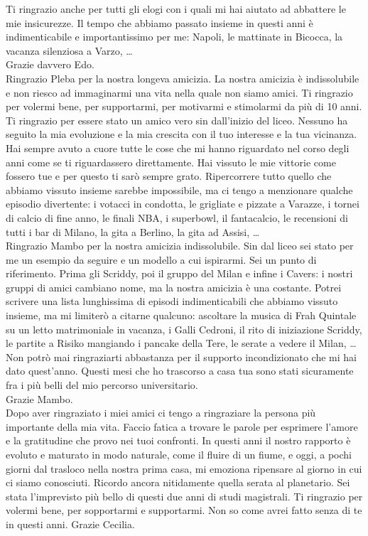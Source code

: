 Ti ringrazio anche per tutti gli elogi con i quali mi hai aiutato ad abbattere le mie insicurezze.
Il tempo che abbiamo passato insieme in questi anni è indimenticabile e importantissimo per me: Napoli, le 
mattinate in Bicocca, la vacanza silenziosa a Varzo, …\\
Grazie davvero Edo.\\
Ringrazio Pleba per la nostra longeva amicizia. La nostra amicizia è indissolubile e non riesco ad immaginarmi 
una vita nella quale non siamo amici. Ti ringrazio per volermi bene, per supportarmi, per motivarmi e stimolarmi 
da più di 10 anni. Ti ringrazio per essere stato un amico vero sin dall’inizio del liceo. Nessuno ha seguito la 
mia evoluzione e la mia crescita con il tuo interesse e la tua vicinanza. Hai sempre avuto a cuore tutte le cose 
che mi hanno riguardato nel corso degli anni come se ti riguardassero direttamente.
Hai vissuto le mie vittorie come fossero tue e per questo ti sarò sempre grato. Ripercorrere tutto quello che 
abbiamo vissuto insieme sarebbe impossibile, ma ci tengo a menzionare qualche episodio divertente: i votacci in 
condotta, le grigliate e pizzate a Varazze, i tornei di calcio di fine anno, le finali NBA, i superbowl, il 
fantacalcio, le recensioni di tutti i bar di Milano, la gita a Berlino, la gita ad Assisi, …\\
Ringrazio Mambo per la nostra amicizia indissolubile. Sin dal liceo sei stato per me un esempio da seguire e un 
modello a cui ispirarmi.
Sei un punto di riferimento. Prima gli Scriddy, poi il gruppo del Milan e infine i Cavers: i nostri gruppi di 
amici cambiano nome, ma la nostra amicizia è una costante. Potrei scrivere una lista lunghissima di episodi 
indimenticabili che abbiamo vissuto insieme, ma mi limiterò a citarne qualcuno: ascoltare la musica di Frah 
Quintale su un letto matrimoniale in vacanza, i Galli Cedroni, il rito di iniziazione Scriddy, le partite a 
Risiko mangiando i pancake della Tere, le serate a vedere il Milan, …
Non potrò mai ringraziarti abbastanza 
per il supporto incondizionato	che mi hai dato quest’anno. Questi mesi che ho trascorso a casa tua sono stati 
sicuramente fra i più belli del mio percorso universitario. \\
Grazie Mambo. \\

Dopo aver ringraziato i miei amici ci tengo a ringraziare la persona più importante della mia vita. 
Faccio fatica a trovare le parole per 
esprimere l’amore e la gratitudine che provo nei tuoi confronti.
In questi anni il nostro rapporto è evoluto e maturato in modo naturale, come il fluire di un fiume, e oggi, 
a pochi giorni dal trasloco nella nostra prima casa, mi emoziona ripensare al giorno in cui ci siamo conosciuti.
Ricordo ancora nitidamente quella serata al planetario. Sei stata l’imprevisto più bello di questi due anni di 
studi magistrali.
Ti ringrazio per volermi bene, per sopportarmi e supportarmi. 
Non so come avrei fatto senza di te in questi anni.
Grazie Cecilia.\\

